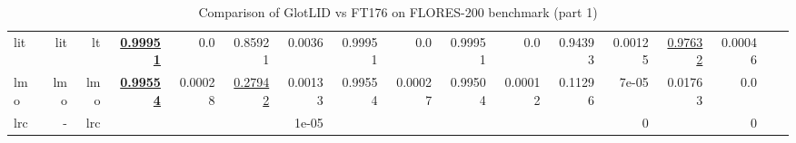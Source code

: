\documentclass[11pt]{article}
\def\flores{FLORES\xspace}
\def\ft176{FT176\xspace}
\begin{document}
\begin{table*}[h]
{\begin{tabular}{lrrrrrrrrrrrrrrrr}
lit         & lit         & lt         & \textbf{\underline{0.99951}}         & 0.0         & 0.85921         & 0.0036         & 0.99951         & 0.0         & 0.99951         & 0.0         & 0.94393         & 0.00125         & \underline{0.97632}         & 0.00046         \\
lmo         & lmo         & lmo         & \textbf{\underline{0.99554}}         & 0.00028         & \underline{0.27942}         & 0.00133         & 0.99554         & 0.00027         & 0.99504         & 0.00012         & 0.11296         & 7e-05         & 0.01763         & 0.0         \\
lrc         & -         & lrc         &          &          &          & 1e-05         &          &          &          &          &          & 0         &          & 0         \\
\end{tabular}
}
\caption{Comparison of GlotLID vs \ft176 on \flores-200 benchmark (part 1)}
\label{tab:appendix_glotlid_ft176_floress_1}
\end{table*}
\end{document}
